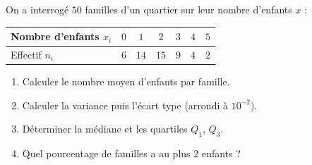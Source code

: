 
On a interrogé $50$ familles d'un quartier sur leur nombre d'enfants $x$ :

\begin{center}
\begin{tabular}{|l|c|c|c|c|c|c|}
\hline
Nombre d'enfants $x_i$ & $0$ & $1$ & $2$ & $3$ & $4$ & $5$ \\ \hline
Effectif $n_i$ & $6$ & $14$ & $15$ & $9$ & $4$ & $2$ \\ \hline
\end{tabular}
\end{center}

\begin{enumerate}
  \item Calculer le nombre moyen d'enfants par famille.
  \item Calculer la variance puis l'écart type (arrondi à $10^{-2}$).
  \item Déterminer la médiane et les quartiles $Q_1$, $Q_3$.
  \item Quel pourcentage de familles a au plus $2$ enfants ?
\end{enumerate}

